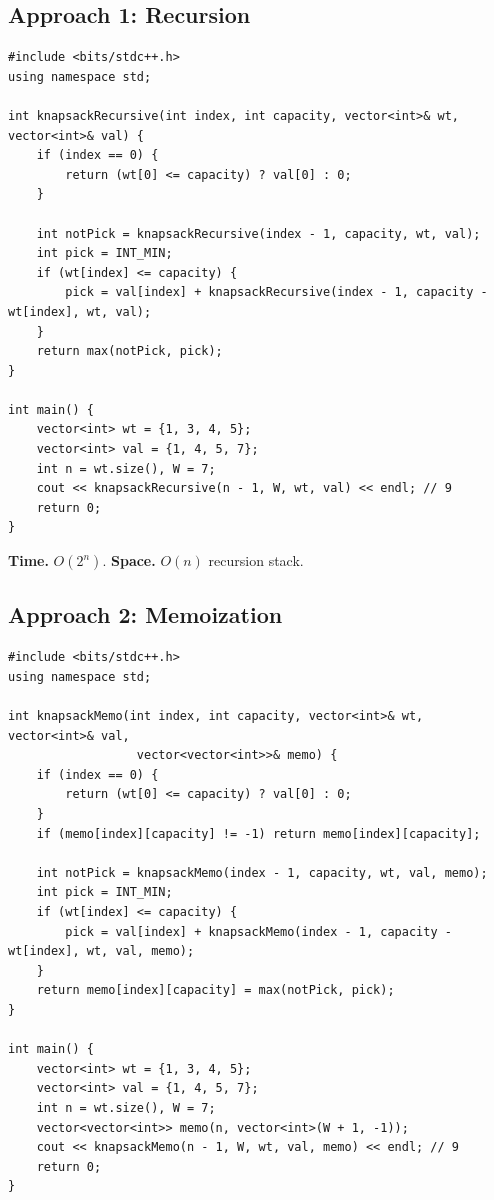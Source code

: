 \subsection*{Approach 1: Recursion}

\begin{lstlisting}
#include <bits/stdc++.h>
using namespace std;

int knapsackRecursive(int index, int capacity, vector<int>& wt, vector<int>& val) {
    if (index == 0) {
        return (wt[0] <= capacity) ? val[0] : 0;
    }

    int notPick = knapsackRecursive(index - 1, capacity, wt, val);
    int pick = INT_MIN;
    if (wt[index] <= capacity) {
        pick = val[index] + knapsackRecursive(index - 1, capacity - wt[index], wt, val);
    }
    return max(notPick, pick);
}

int main() {
    vector<int> wt = {1, 3, 4, 5};
    vector<int> val = {1, 4, 5, 7};
    int n = wt.size(), W = 7;
    cout << knapsackRecursive(n - 1, W, wt, val) << endl; // 9
    return 0;
}
\end{lstlisting}

\begin{complexitybox}
\textbf{Time.} $O(2^n)$.
\textbf{Space.} $O(n)$ recursion stack.
\end{complexitybox}

\subsection*{Approach 2: Memoization}

\begin{lstlisting}
#include <bits/stdc++.h>
using namespace std;

int knapsackMemo(int index, int capacity, vector<int>& wt, vector<int>& val,
                  vector<vector<int>>& memo) {
    if (index == 0) {
        return (wt[0] <= capacity) ? val[0] : 0;
    }
    if (memo[index][capacity] != -1) return memo[index][capacity];

    int notPick = knapsackMemo(index - 1, capacity, wt, val, memo);
    int pick = INT_MIN;
    if (wt[index] <= capacity) {
        pick = val[index] + knapsackMemo(index - 1, capacity - wt[index], wt, val, memo);
    }
    return memo[index][capacity] = max(notPick, pick);
}

int main() {
    vector<int> wt = {1, 3, 4, 5};
    vector<int> val = {1, 4, 5, 7};
    int n = wt.size(), W = 7;
    vector<vector<int>> memo(n, vector<int>(W + 1, -1));
    cout << knapsackMemo(n - 1, W, wt, val, memo) << endl; // 9
    return 0;
}
\end{lstlisting}

